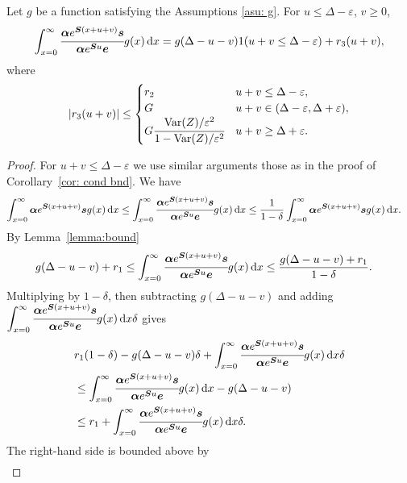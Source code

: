 \begin{cor}\label{cor: cond bnd 2}
	Let \(g\) be a function satisfying the Assumptions \ref{asu: g}. For \(u\leq \Delta-\varepsilon \), \(v\geq 0\), 
	\[\int_{x=0}^\infty \cfrac{\boldsymbol \alpha  e^{\boldsymbol{S} (x+u+v)} \boldsymbol s}{\boldsymbol \alpha  e^{\boldsymbol{S} u} \boldsymbol e} g(x)\, \mathrm{d} x = g(\Delta-u-v) 1(u+v\leq\Delta-\varepsilon) + r_3 (u+v),\]
	where 
	\[\left|r_3 (u+v)\right|\leq \begin{cases} 
		r_2  & u+v\leq \Delta-\varepsilon,\\
		G & u+v\in(\Delta-\varepsilon,\Delta+\varepsilon), \\
		G\cfrac{\mathrm{Var}(Z)/\varepsilon^2}{1-\mathrm{Var}(Z)/\varepsilon^2} & u+v \geq \Delta + \varepsilon.
		\end{cases}\]
\end{cor}
\begin{proof}
	For \(u+v \leq \Delta - \varepsilon\) we use similar arguments those as in the proof of Corollary~\ref{cor: cond bnd}. We have 
	\begin{align*}
		\int_{x=0}^\infty \boldsymbol \alpha  e^{\boldsymbol{S} (x+u+v)} \boldsymbol s g(x)\, \mathrm{d} x
		\leq \int_{x=0}^\infty \cfrac{\boldsymbol \alpha  e^{\boldsymbol{S} (x+u+v)} \boldsymbol s}{\boldsymbol \alpha  e^{\boldsymbol{S} u} \boldsymbol e} g(x)\, \mathrm{d} x
		&\leq \frac{1}{1-\delta }\int_{x=0}^\infty \boldsymbol \alpha  e^{\boldsymbol{S} (x+u+v)} \boldsymbol s g(x)\, \mathrm{d} x.
	\end{align*}
	By Lemma~\ref{lemma:bound}  
	\begin{align*}
		g(\Delta-u-v)+r _1
		&\leq \int_{x=0}^\infty \cfrac{\boldsymbol \alpha  e^{\boldsymbol{S} (x+u+v)} \boldsymbol s}{\boldsymbol \alpha  e^{\boldsymbol{S} u} \boldsymbol e} g(x)\, \mathrm{d} x
		\leq \frac{g(\Delta-u-v)+r _1}{1-\delta }. 
	\end{align*}
	Multiplying by \(1-\delta \), then subtracting \(g(\Delta-u-v)\) and adding \(\displaystyle\int_{x=0}^\infty \cfrac{\boldsymbol \alpha  e^{\boldsymbol{S} (x+u+v)} \boldsymbol s}{\boldsymbol \alpha  e^{\boldsymbol{S} u} \boldsymbol e} g(x)\, \mathrm{d} x\delta \) gives
	\begin{align*}
		&r _1(1-\delta ) - g(\Delta-u-v)\delta +\int_{x=0}^\infty \cfrac{\boldsymbol \alpha  e^{\boldsymbol{S} (x+u+v)} \boldsymbol s}{\boldsymbol \alpha  e^{\boldsymbol{S} u} \boldsymbol e} g(x)\, \mathrm{d} x\delta 
		\\&\leq \int_{x=0}^\infty \cfrac{\boldsymbol \alpha  e^{\boldsymbol{S} (x+u+v)} \boldsymbol s}{\boldsymbol \alpha  e^{\boldsymbol{S} u} \boldsymbol e} g(x)\, \mathrm{d} x -g(\Delta-u-v)
		\\&\leq r _1+\int_{x=0}^\infty \cfrac{\boldsymbol \alpha  e^{\boldsymbol{S} (x+u+v)} \boldsymbol s}{\boldsymbol \alpha  e^{\boldsymbol{S} u} \boldsymbol e} g(x)\, \mathrm{d} x\delta .
	\end{align*}
	The right-hand side is bounded above by 
	\begin{align*}

\end{align*}
\end{proof}

